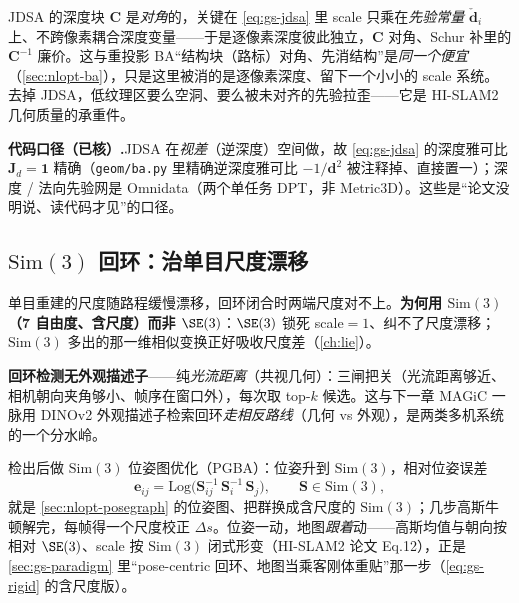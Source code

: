 \begin{insight}
JDSA 的深度块 $\mathbf C$ 是\emph{对角}的，关键在 \cref{eq:gs-jdsa} 里 scale 只乘在\emph{先验常量} $\check{\mathbf d}_i$ 上、不跨像素耦合深度变量——于是逐像素深度彼此独立，$\mathbf C$ 对角、Schur 补里的 $\mathbf C^{-1}$ 廉价。这与重投影 BA“结构块（路标）对角、先消结构”是\emph{同一个便宜}（\cref{sec:nlopt-ba}），只是这里被消的是逐像素深度、留下一个小小的 scale 系统。去掉 JDSA，低纹理区要么空洞、要么被未对齐的先验拉歪——它是 HI-SLAM2 几何质量的承重件。
\end{insight}

\begin{note}
\textbf{代码口径（已核）.}\;JDSA 在\emph{视差}（逆深度）空间做，故 \cref{eq:gs-jdsa} 的深度雅可比 $\mathbf J_d=\mathbf 1$ 精确（\texttt{geom/ba.py} 里精确逆深度雅可比 $-1/\mathbf d^2$ 被注释掉、直接置一）；深度 / 法向先验网是 Omnidata（两个单任务 DPT，非 Metric3D）。这些是“论文没明说、读代码才见”的口径。
\end{note}

\subsection{\texorpdfstring{$\mathrm{Sim}(3)$}{Sim(3)} 回环：治单目尺度漂移}

单目重建的尺度随路程缓慢漂移，回环闭合时两端尺度对不上。\textbf{为何用 $\mathrm{Sim}(3)$（7 自由度、含尺度）而非 $\SE(3)$}：$\SE(3)$ 锁死 scale$=1$、纠不了尺度漂移；$\mathrm{Sim}(3)$ 多出的那一维相似变换正好吸收尺度差（\cref{ch:lie}）。

\textbf{回环检测无外观描述子}——纯\emph{光流距离}（共视几何）：三闸把关（光流距离够近、相机朝向夹角够小、帧序在窗口外），每次取 top-$k$ 候选。这与下一章 MAGiC 一脉用 DINOv2 外观描述子检索回环\emph{走相反路线}（几何 vs 外观），是两类多机系统的一个分水岭。

检出后做 $\mathrm{Sim}(3)$ 位姿图优化（PGBA）：位姿升到 $\mathrm{Sim}(3)$，相对位姿误差
\begin{equation}
\mathbf e_{ij}=\mathrm{Log}\big(\mathbf S_{ij}^{-1}\,\mathbf S_i^{-1}\,\mathbf S_j\big),\qquad \mathbf S\in\mathrm{Sim}(3),
\label{eq:gs-sim3pgo}
\end{equation}
就是 \cref{sec:nlopt-posegraph} 的位姿图、把群换成含尺度的 $\mathrm{Sim}(3)$；几步高斯牛顿解完，每帧得一个尺度校正 $\Delta s$。位姿一动，地图\emph{跟着}动——高斯均值与朝向按相对 $\SE(3)$、scale 按 $\mathrm{Sim}(3)$ 闭式形变（HI-SLAM2 论文 Eq.12），正是 \cref{sec:gs-paradigm} 里“pose-centric 回环、地图当乘客刚体重贴”那一步（\cref{eq:gs-rigid} 的含尺度版）。

